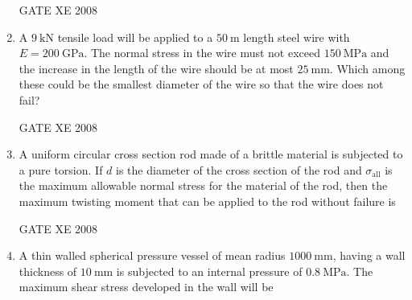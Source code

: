\documentclass[12pt]{article}
\begin{document}
\begin{enumerate}[label=Q\arabic*.]
GATE XE 2008  

\item A $9 \ \text{kN}$ tensile load will be applied to a $50 \ \text{m}$ length steel wire with $E = 200 \ \text{GPa}$. The normal stress in the wire must not exceed $150 \ \text{MPa}$ and the increase in the length of the wire should be at most $25 \ \text{mm}$. Which among these could be the smallest diameter of the wire so that the wire does not fail?  

\begin{enumerate}[label=(\Alph*)]
\end{enumerate}

GATE XE 2008  

\item A uniform circular cross section rod made of a brittle material is subjected to a pure torsion. If $d$ is the diameter of the cross section of the rod and $\sigma_{\text{all}}$ is the maximum allowable normal stress for the material of the rod, then the maximum twisting moment that can be applied to the rod without failure is  

\begin{enumerate}[label=(\Alph*)]
\end{enumerate}

GATE XE 2008  

\item A thin walled spherical pressure vessel of mean radius $1000 \ \text{mm}$, having a wall thickness of $10 \ \text{mm}$ is subjected to an internal pressure of $0.8 \ \text{MPa}$. The maximum shear stress developed in the wall will be  

\begin{enumerate}[label=(\Alph*)]
\end{enumerate}


\end{enumerate}
\end{document}
